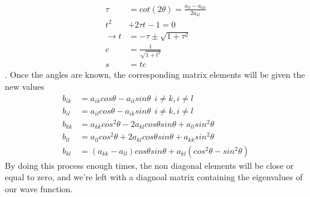 \documentclass[12pt]{article}
\begin{document}
\begin{align*}
    \tau &= cot(2\theta) = \frac{a_{ll}-a_{kk}}{2a_{kl}}\\
    t^2 &+2\tau t -1 = 0\\
    \rightarrow t &= -\tau\pm \sqrt{1+\tau^2}\\
    c &= \frac{1}{\sqrt{1+t^2}}\\
    s &= tc
\end{align*}.
Once the angles are known, the corresponding matrix elements will be given the new values
\begin{align*}
    b_{ik} &= a_{ik}cos\theta-a_{il}sin\theta\ \ i\neq k, i \neq l\\
    b_{il} &= a_{il}cos\theta-a_{ik}sin\theta\ \ i\neq k, i \neq l\\
    b_{kk} &= a_{kk}cos^2\theta-2a_{kl}cos\theta sin\theta + a_ {ll}sin^2\theta\\
    b_{ll} &= a_{ll}cos^2\theta+2a_{kl}cos\theta sin\theta + a_ {kk}sin^2\theta\\
    b_ {kl} &= (a_{kk}-a_{ll})cos\theta sin\theta +a_{kl}(cos^2\theta-sin^2\theta)
\end{align*}
By doing this process enough times, the non diagonal elements will be close or equal to zero, and we're left with a diagnoal matrix containing the eigenvalues of our wave function.\\
\end{document}

